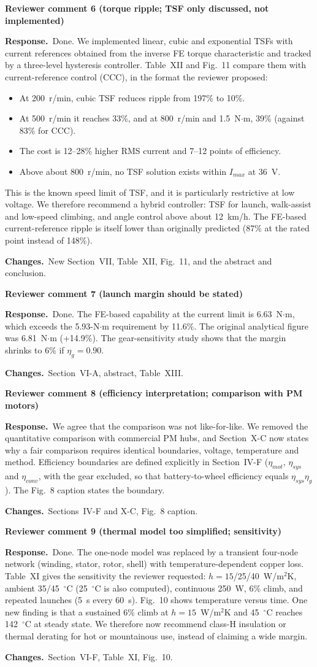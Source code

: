 \documentclass[10pt]{article}
\newcommand{\rev}[1]{\par\medskip\noindent\textbf{Reviewer comment #1}\par}
\newcommand{\resp}{\par\noindent\textcolor{blue!50!black}{\textbf{Response.}}~}
\newcommand{\chg}{\par\noindent\textcolor{green!35!black}{\textbf{Changes.}}~}
\begin{document}
\rev{6 (torque ripple; TSF only discussed, not implemented)}
\resp Done. We implemented linear, cubic and exponential TSFs with current
references obtained from the inverse FE torque characteristic and tracked by a
three-level hysteresis controller. Table~XII and Fig.~11 compare them with
current-reference control (CCC), in the format the reviewer proposed:
\begin{itemize}[nosep]
\item At 200~r/min, cubic TSF reduces ripple from 197\% to 10\%.
\item At 500~r/min it reaches 33\%, and at 800~r/min and 1.5~N$\cdot$m, 39\%
(against 83\% for CCC).
\item The cost is 12--28\% higher RMS current and 7--12 points of efficiency.
\item Above about 800~r/min, no TSF solution exists within $I_{max}$ at 36~V.
\end{itemize}
This is the known speed limit of TSF, and it is particularly restrictive at
low voltage. We therefore recommend a hybrid controller: TSF for launch,
walk-assist and low-speed climbing, and angle control above about 12~km/h. The
FE-based current-reference ripple is itself lower than originally predicted
(87\% at the rated point instead of 148\%).
\chg New Section~VII, Table~XII, Fig.~11, and the abstract and conclusion.

\rev{7 (launch margin should be stated)}
\resp Done. The FE-based capability at the current limit is 6.63~N$\cdot$m,
which exceeds the 5.93-N$\cdot$m requirement by 11.6\%. The original
analytical figure was 6.81~N$\cdot$m (+14.9\%). The gear-sensitivity study
shows that the margin shrinks to 6\% if $\eta_g=0.90$.
\chg Section~VI-A, abstract, Table~XIII.

\rev{8 (efficiency interpretation; comparison with PM motors)}
\resp We agree that the comparison was not like-for-like. We removed the
quantitative comparison with commercial PM hubs, and Section~X-C now states
why a fair comparison requires identical boundaries, voltage, temperature and
method. Efficiency boundaries are defined explicitly in Section~IV-F
($\eta_{mot}$, $\eta_{sys}$ and $\eta_{conv}$, with the gear excluded, so that
battery-to-wheel efficiency equals $\eta_{sys}\eta_g$). The Fig.~8 caption
states the boundary.
\chg Sections~IV-F and X-C, Fig.~8 caption.

\rev{9 (thermal model too simplified; sensitivity)}
\resp Done. The one-node model was replaced by a transient four-node network
(winding, stator, rotor, shell) with temperature-dependent copper loss.
Table~XI gives the sensitivity the reviewer requested: $h=15$/25/40~W/m$^2$K,
ambient 35/45~$^\circ$C (25~$^\circ$C is also computed), continuous 250~W,
6\% climb, and repeated launches (5~s every 60~s). Fig.~10 shows temperature
versus time. One new finding is that a sustained 6\% climb at
$h=15$~W/m$^2$K and 45~$^\circ$C reaches 142~$^\circ$C at steady state. We
therefore now recommend class-H insulation or thermal derating for hot or
mountainous use, instead of claiming a wide margin.
\chg Section~VI-F, Table~XI, Fig.~10.
\end{document}
